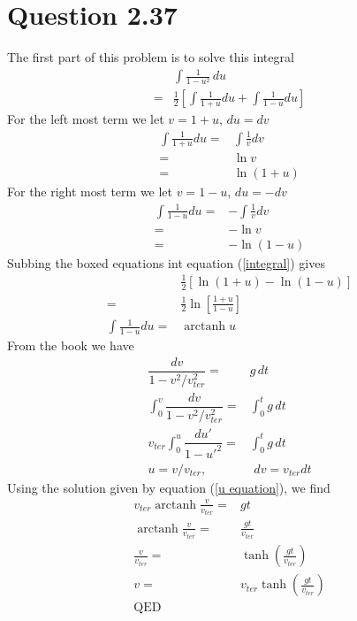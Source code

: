 \documentclass[12pt, a4paper]{article}
\DeclareMathOperator\arctanh{arctanh}
\begin{document}
\pagebreak
\section*{Question 2.37}
The first part of this problem is to solve this integral 
\begin{align}
&\int \frac{1}{1-u^2} \, du
\\
=& \frac{1}{2}\left[ \int \frac{1}{1+u} du +  \int \frac{1}{1-u} du \right] \label{integral}
\end{align}
For the left most term we let $v = 1+u$, $du = dv$
\begin{align*}
\int \frac{1}{1+u} du  =& \int \frac{1}{v} dv
\\
=& \ln v
\\
=& \boxed{\ln (1+u)}
\end{align*}
For the right most term we let $v = 1-u$, $du = -dv$
\begin{align*}
\int \frac{1}{1-u} du =& -\int \frac{1}{v} dv
\\
=& -\ln v
\\
=& \boxed{-\ln (1-u)}
\end{align*}
Subbing the boxed equations int equation (\ref{integral}) gives 
\begin{align}
&\frac{1}{2}\left[ \ln(1+u)  - \ln(1-u) \right]
\\
=& \frac{1}{2}\ln\left[\frac{1+u}{1-u}\right]
\\
\int \frac{1}{1-u} du=& \arctanh u \label{u equation}
\end{align}
From the book we have 
\begin{align*}
\dfrac{dv}{1-v^2/v_{ter}^2} =& g \, dt
\\
\int_0^v\dfrac{dv}{1-v^2/v_{ter}^2} =&  \int_0^t g \, dt
\\
v_{ter}\int_0^{u}\dfrac{du'}{1-u'^2} =&  \int_0^t g \, dt
\\
u = v/v_{ter}, &\,\, dv = v_{ter}dt
\end{align*}
Using the solution given by equation (\ref{u equation}), we find 
\begin{align*}
v_{ter} \arctanh \frac{v}{v_{ter}} =&  gt
\\
\arctanh \frac{v}{v_{ter}} =&  \frac{gt}{v_{ter}}
\\
\frac{v}{v_{ter}} =&  \tanh\left(\frac{gt}{v_{ter}}\right)
\\
v =&  \boxed{v_{ter}\tanh\left(\frac{gt}{v_{ter}}\right)}
\\
\text{QED}&
\end{align*}
\end{document}
